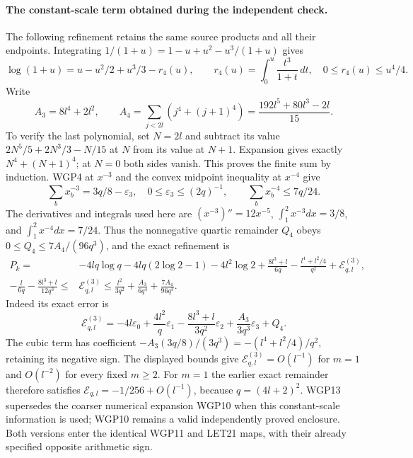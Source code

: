 \documentclass[11pt,a4paper]{article}
\begin{document}
\paragraph{The constant-scale term obtained during the independent check.}
The following refinement retains the same source products and all their
endpoints. Integrating $1/(1+u)=1-u+u^2-u^3/(1+u)$ gives
\[
 \log(1+u)=u-u^2/2+u^3/3-r_4(u),\qquad
 r_4(u)=\int_0^u\frac{t^3}{1+t}\,dt,\quad0\le r_4(u)\le u^4/4.
\]
Write
\[
 A_3=8l^4+2l^2,\qquad
 A_4=\sum_{j<2l}(j^4+(j+1)^4)=\frac{192l^5+80l^3-2l}{15}.
 \tag{WGP12}
\]
To verify the last polynomial, set $N=2l$ and subtract its value
$2N^5/5+2N^3/3-N/15$ at $N$ from its value at $N+1$.
Expansion gives exactly $N^4+(N+1)^4$; at $N=0$ both sides vanish.
This proves the finite sum by induction. WGP4 at $x^{-3}$ and
the convex midpoint inequality at $x^{-4}$ give
\[
 \sum_bx_b^{-3}=3q/8-\varepsilon_3,\quad
 0\le\varepsilon_3\le(2q)^{-1},\qquad
 \sum_bx_b^{-4}\le7q/24.
\]
The derivatives and integrals used here are $(x^{-3})''=12x^{-5}$,
$\int_1^2x^{-3}dx=3/8$, and $\int_1^2x^{-4}dx=7/24$.
Thus the nonnegative quartic remainder $Q_4$ obeys
$0\le Q_4\le7A_4/(96q^3)$, and the exact refinement is
\[
 \boxed{\begin{aligned}
 P_k={}&-4lq\log q-4lq(2\log2-1)-4l^2\log2
       +\frac{8l^3+l}{6q}-\frac{l^4+l^2/4}{q^2}
       +\mathcal E^{(3)}_{q,l},\\
 -\frac l{6q}-\frac{8l^3+l}{12q^3}
 \le{}&\mathcal E^{(3)}_{q,l}\le
 \frac{l^2}{3q^2}+\frac{A_3}{6q^4}+\frac{7A_4}{96q^3}.
 \end{aligned}}\tag{WGP13}
\]
Indeed its exact error is
\[
 \mathcal E^{(3)}_{q,l}=-4l\varepsilon_0
 +\frac{4l^2}{q}\varepsilon_1
 -\frac{8l^3+l}{3q^2}\varepsilon_2
 +\frac{A_3}{3q^3}\varepsilon_3+Q_4.
 \tag{WGP14}
\]
The cubic term has coefficient $-A_3(3q/8)/(3q^3)
=-(l^4+l^2/4)/q^2$, retaining its negative sign.
The displayed bounds give $\mathcal E^{(3)}_{q,l}=O(l^{-1})$
for $m=1$ and $O(l^{-2})$ for every fixed $m\ge2$.
For $m=1$ the earlier exact remainder therefore satisfies
$\mathcal E_{q,l}=-1/256+O(l^{-1})$, because $q=(4l+2)^2$.
WGP13 supersedes the coarser numerical expansion WGP10 when this
constant-scale information is used; WGP10 remains a valid independently
proved enclosure. Both versions enter the identical WGP11 and LET21
maps, with their already specified opposite arithmetic sign.


\clearpage

\end{document}
